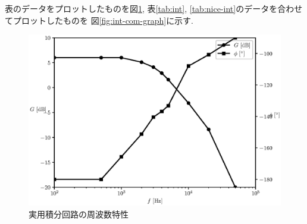 \documentclass[titlepage]{jsarticle}
\begin{document}
            表のデータをプロットしたものを図\ref{fig:nice-int-graph},
            表\ref{tab:int}, \ref{tab:nice-int}のデータを合わせてプロットしたものを
            図\ref{fig:int-com-graph}に示す.

            \begin{figure}[h]
                \centering
                \includegraphics[width=0.8\hsize]{img/nice-int-graph.eps}
                \caption{実用積分回路の周波数特性}
                \label{fig:nice-int-graph}
            \end{figure}
\end{document}
